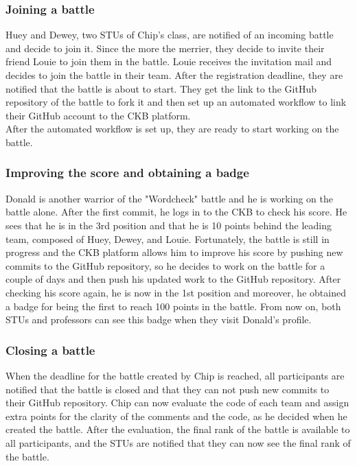 \subsubsection{Joining a battle}
Huey and Dewey, two STUs of Chip's class, are notified of an incoming battle and decide to join it.
Since the more the merrier, they decide to invite their friend Louie to join them in the battle.
Louie receives the invitation mail and decides to join the battle in their team.
After the registration deadline, they are notified that the battle is about to start.
They get the link to the GitHub repository of the battle to fork it and then set up an automated workflow to link their GitHub account to the CKB platform. \\
After the automated workflow is set up, they are ready to start working on the battle.

\subsubsection{Improving the score and obtaining a badge}
Donald is another warrior of the "Wordcheck" battle and he is working on the battle alone.
After the first commit, he logs in to the CKB to check his score.
He sees that he is in the 3rd position and that he is 10 points behind the leading team, composed of Huey, Dewey, and Louie.
Fortunately, the battle is still in progress and the CKB platform allows him to improve his score by pushing new commits to the GitHub repository, so he decides to work on the battle for a couple of days and then push his updated work to the GitHub repository.
After checking his score again, he is now in the 1st position and moreover, he obtained a badge for being the first to reach 100 points in the battle.
From now on, both STUs and professors can see this badge when they visit Donald's profile.

\subsubsection{Closing a battle}
When the deadline for the battle created by Chip is reached, all participants are notified that the battle is closed and that they can not push new commits to their GitHub repository.
Chip can now evaluate the code of each team and assign extra points for the clarity of the comments and the code, as he decided when he created the battle.
After the evaluation, the final rank of the battle is available to all participants, and the STUs are notified that they can now see the final rank of the battle.

